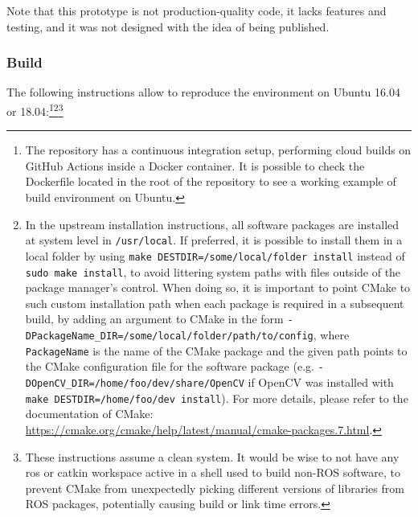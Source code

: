 \documentclass[11pt, letterpaper, twoside]{article}
\begin{document}
Note that this prototype is not production-quality code, it lacks features and
testing, and it was not designed with the idea of being published.

\subsubsection{Build}

The following instructions allow to reproduce the environment on Ubuntu 16.04
or 18.04:\footnote{The repository has a continuous integration setup,
performing cloud builds on GitHub Actions inside a Docker container. It is
possible to check the Dockerfile located in the root of the repository to
see a working example of build environment on Ubuntu.}\footnote{In the
upstream installation instructions, all software packages are installed at
system level in \texttt{/usr/local}. If preferred, it is possible to
install them in a local folder by using \texttt{make
DESTDIR=/some/local/folder install} instead of \texttt{sudo make install},
to avoid littering system paths with files outside of the package manager's
control. When doing so, it is important to point CMake to such custom
installation path when each package is required in a subsequent build, by
adding an argument to CMake in the form
\texttt{-DPackageName\_DIR=/some/local/folder/path/to/config}, where
\texttt{PackageName} is the name of the CMake package and the given path
points to the CMake configuration file for the software package (e.g.
\texttt{-DOpenCV\_DIR=/home/foo/dev/share/OpenCV} if OpenCV was installed
with \texttt{make DESTDIR=/home/foo/dev install}). For more details, please
refer to the documentation of CMake:
\url{https://cmake.org/cmake/help/latest/manual/cmake-packages.7.html}.}\footnote{These
instructions assume a clean system. It would be wise to not have any \gls{ros}
or catkin workspace active in a shell used to build non-ROS software, to
prevent CMake from unexpectedly picking different versions of libraries from
ROS packages, potentially causing build or link time errors.}
\end{document}
